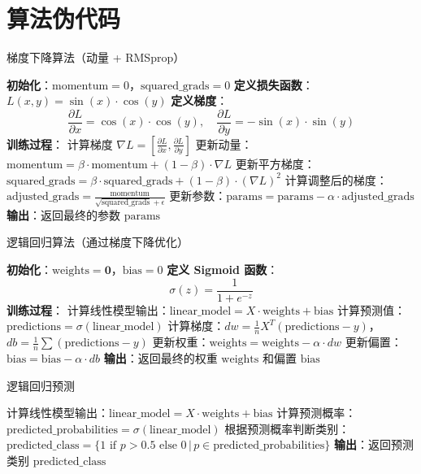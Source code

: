 \documentclass{article}
\begin{document}
\section{算法伪代码}

\begin{algorithm}
\caption{梯度下降算法（动量 + RMSprop）}
\textbf{初始化}：$\text{momentum} = 0$，$\text{squared\_grads} = 0$\;
\textbf{定义损失函数}：$L(x, y) = \sin(x) \cdot \cos(y)$\;
\textbf{定义梯度}：
\[
\frac{\partial L}{\partial x} = \cos(x) \cdot \cos(y), \quad \frac{\partial L}{\partial y} = -\sin(x) \cdot \sin(y)
\]
\textbf{训练过程}：
 {
    计算梯度 $\nabla L = \left[ \frac{\partial L}{\partial x}, \frac{\partial L}{\partial y} \right]$\;
    更新动量：$\text{momentum} = \beta \cdot \text{momentum} + (1 - \beta) \cdot \nabla L$\;
    更新平方梯度：$\text{squared\_grads} = \beta \cdot \text{squared\_grads} + (1 - \beta) \cdot (\nabla L)^2$\;
    计算调整后的梯度：$\text{adjusted\_grads} = \frac{\text{momentum}}{\sqrt{\text{squared\_grads}} + \epsilon}$\;
    更新参数：$\text{params} = \text{params} - \alpha \cdot \text{adjusted\_grads}$\;
}
\textbf{输出}：返回最终的参数 $\text{params}$\;
\end{algorithm}

\begin{algorithm}
\caption{逻辑回归算法（通过梯度下降优化）}
\textbf{初始化}：$\text{weights} = \mathbf{0}$，$\text{bias} = 0$\;
\textbf{定义 Sigmoid 函数}：
\[
\sigma(z) = \frac{1}{1 + e^{-z}}
\]
\textbf{训练过程}：
 {
    计算线性模型输出：$\text{linear\_model} = X \cdot \text{weights} + \text{bias}$\;
    计算预测值：$\text{predictions} = \sigma(\text{linear\_model})$\;
    计算梯度：$dw = \frac{1}{n} X^T (\text{predictions} - y)$，$db = \frac{1}{n} \sum (\text{predictions} - y)$\;
    更新权重：$\text{weights} = \text{weights} - \alpha \cdot dw$\;
    更新偏置：$\text{bias} = \text{bias} - \alpha \cdot db$\;
}
\textbf{输出}：返回最终的权重 $\text{weights}$ 和偏置 $\text{bias}$\;
\end{algorithm}

\begin{algorithm}
\caption{逻辑回归预测}
计算线性模型输出：$\text{linear\_model} = X \cdot \text{weights} + \text{bias}$\;
计算预测概率：$\text{predicted\_probabilities} = \sigma(\text{linear\_model})$\;
根据预测概率判断类别：$\text{predicted\_class} = \{1 \text{ if } p > 0.5 \text{ else } 0 \, | \, p \in \text{predicted\_probabilities}\}$\;
\textbf{输出}：返回预测类别 $\text{predicted\_class}$\;
\end{algorithm}
\end{document}
